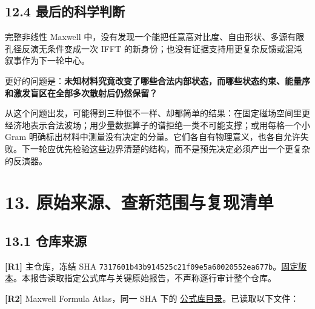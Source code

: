 \documentclass[11pt,a4paper]{article}
\begin{document}
\hypertarget{ux6700ux540eux7684ux79d1ux5b66ux5224ux65ad}{%
\subsection{12.4
最后的科学判断}\label{ux6700ux540eux7684ux79d1ux5b66ux5224ux65ad}}

完整非线性 Maxwell
中，没有发现一个能把任意高对比度、自由形状、多源有限孔径反演无条件变成一次
IFFT 的新身份；也没有证据支持用更复杂反馈或混沌叙事作为下一轮中心。

更好的问题是：\textbf{未知材料究竟改变了哪些合法内部状态，而哪些状态约束、能量序和激发盲区在全部多次散射后仍然保留？}

从这个问题出发，可能得到三种很不一样、却都简单的结果：在固定磁场空间里更经济地表示合法波场；用少量数据算子的谱拒绝一类不可能支撑；或用每格一个小
Gram
明确标出材料中测量没有决定的分量。它们各自有物理意义，也各自允许失败。下一轮应优先检验这些边界清楚的结构，而不是预先决定必须产出一个更复杂的反演器。

\hypertarget{ux539fux59cbux6765ux6e90ux67e5ux65b0ux8303ux56f4ux4e0eux590dux73b0ux6e05ux5355}{%
\section{13.
原始来源、查新范围与复现清单}\label{ux539fux59cbux6765ux6e90ux67e5ux65b0ux8303ux56f4ux4e0eux590dux73b0ux6e05ux5355}}

\hypertarget{ux4ed3ux5e93ux6765ux6e90}{%
\subsection{13.1 仓库来源}\label{ux4ed3ux5e93ux6765ux6e90}}

\textbf{{[}R1{]}} 主仓库，冻结 SHA
\texttt{7317601b43b914525c21f09e5a60020552ea677b}。\href{https://github.com/migodam/b1-probabilistic-maxwell-imaging/tree/7317601b43b914525c21f09e5a60020552ea677b}{固定版本}。本报告读取指定公式库与关键原始报告，不声称逐行审计整个仓库。

\textbf{{[}R2{]}} Maxwell Formula Atlas，同一 SHA 下的
\href{https://github.com/migodam/b1-probabilistic-maxwell-imaging/tree/7317601b43b914525c21f09e5a60020552ea677b/research/maxwell_formula_atlas}{公式库目录}。已读取以下文件：
\end{document}
